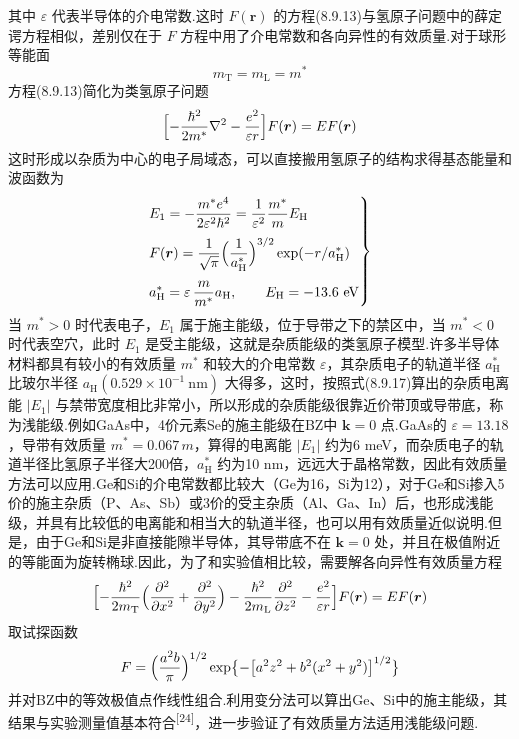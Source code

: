 其中 $\varepsilon$ 代表半导体的介电常数.这时 $F(\boldsymbol{r})$ 的方程(8.9.13)与氢原子问题中的薛定谔方程相似，差别仅在于 $F$ 方程中用了介电常数和各向异性的有效质量.对于球形等能面
\begin{equation}
  m_{\mathrm{T}}=m_{\mathrm{L}}=m^{*}
\end{equation}
方程(8.9.13)简化为类氢原子问题
\begin{equation}
  \Bigl[-\frac{\hbar^{2}}{2m^{*}}\nabla^{2}-\frac{e^{2}}{\varepsilon r}\Bigr]F(\boldsymbol{r})=EF(\boldsymbol{r})
\end{equation}
这时形成以杂质为中心的电子局域态，可以直接搬用氢原子的结构求得基态能量和波函数为
\begin{equation}
  \left.
  \begin{aligned}
    &E_{1}=-\frac{m^{*}e^{4}}{2\varepsilon^{2}\hbar^{2}}
    =\frac{1}{\varepsilon^{2}}\frac{m^{*}}{m}E_{\mathrm{H}}\\[0.3em]
    &F(\boldsymbol{r})=\frac{1}{\sqrt{\pi}}\Bigl(\frac{1}{a_{\mathrm{H}}^{*}}\Bigr)^{3/2}\exp(-r/a_{\mathrm{H}}^{*})\\[0.3em]
    &a_{\mathrm{H}}^{*}=\varepsilon\,\frac{m}{m^{*}}a_{\mathrm{H}},\qquad E_{\mathrm{H}}=-13.6\ \mathrm{eV}
  \end{aligned}\right\}
\end{equation}
当 $m^{*}>0$ 时代表电子，$E_{1}$ 属于施主能级，位于导带之下的禁区中，当 $m^{*}<0$ 时代表空穴，此时 $E_{1}$ 是受主能级，这就是杂质能级的类氢原子模型.许多半导体材料都具有较小的有效质量 $m^{*}$ 和较大的介电常数 $\varepsilon$，其杂质电子的轨道半径 $a_{\mathrm{H}}^{*}$ 比玻尔半径 $a_{\mathrm{H}}(0.529\times10^{-1}\ \mathrm{nm})$ 大得多，这时，按照式(8.9.17)算出的杂质电离能 $|E_{1}|$ 与禁带宽度相比非常小，所以形成的杂质能级很靠近价带顶或导带底，称为浅能级.例如GaAs中，4价元素Se的施主能级在BZ中 $\boldsymbol{k}=0$ 点.GaAs的 $\varepsilon=13.18$，导带有效质量 $m^{*}=0.067\,m$，算得的电离能 $|E_{1}|$ 约为6 meV，而杂质电子的轨道半径比氢原子半径大200倍，$a_{\mathrm{H}}^{*}$ 约为10 nm，远远大于晶格常数，因此有效质量方法可以应用.Ge和Si的介电常数都比较大（Ge为16，Si为12），对于Ge和Si掺入5价的施主杂质（P、As、Sb）或3价的受主杂质（Al、Ga、In）后，也形成浅能级，并具有比较低的电离能和相当大的轨道半径，也可以用有效质量近似说明.但是，由于Ge和Si是非直接能隙半导体，其导带底不在 $\boldsymbol{k}=0$ 处，并且在极值附近的等能面为旋转椭球.因此，为了和实验值相比较，需要解各向异性有效质量方程
\begin{equation}
  \Bigl[-\frac{\hbar^{2}}{2m_{\mathrm{T}}}\Bigl(\frac{\partial^{2}}{\partial x^{2}}+\frac{\partial^{2}}{\partial y^{2}}\Bigr)
  -\frac{\hbar^{2}}{2m_{\mathrm{L}}}\frac{\partial^{2}}{\partial z^{2}}-\frac{e^{2}}{\varepsilon r}\Bigr]F(\boldsymbol{r})=EF(\boldsymbol{r})
\end{equation}
取试探函数
\begin{equation}
  F=\Bigl(\frac{a^{2}b}{\pi}\Bigr)^{1/2}
  \exp\bigl\{-\bigl[a^{2}z^{2}+b^{2}(x^{2}+y^{2})\bigr]^{1/2}\bigr\}
\end{equation}
并对BZ中的等效极值点作线性组合.利用变分法可以算出Ge、Si中的施主能级，其结果与实验测量值基本符合\textsuperscript{[24]}，进一步验证了有效质量方法适用浅能级问题.

